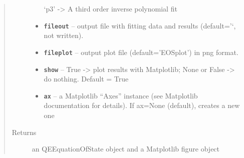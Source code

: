\documentclass[letterpaper,10pt,english]{sphinxmanual}
\begin{document}
\begin{fulllineitems}
\begin{quote}
\begin{description}
\begin{itemize}
`p3' -\textgreater{} A third order inverse polynomial fit


\item {} 
\textbf{\texttt{fileout}} -- output file with fitting data and results (default='`, not written).

\item {} 
\textbf{\texttt{fileplot}} -- output plot file (default='EOSplot') in png format.

\item {} 
\textbf{\texttt{show}} -- True -\textgreater{} plot results with Matplotlib; None or False -\textgreater{} do nothing. Default = True

\item {} 
\textbf{\texttt{ax}} -- a Matplotlib ``Axes'' instance (see Matplotlib documentation for details). If ax=None (default), creates
a new one

\end{itemize}

\item[{Returns}] \leavevmode
an QEEquationOfState object and a Matplotlib figure object

\end{description}\end{quote}

\end{fulllineitems}

\end{document}
